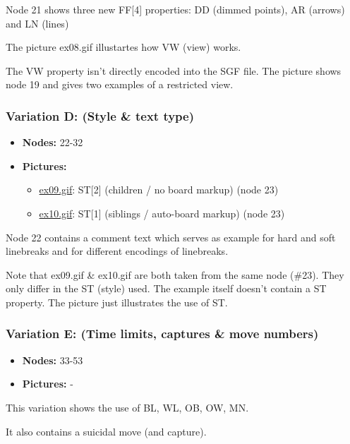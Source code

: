 Node 21 shows three new FF{[}4{]} properties: DD (dimmed points), AR
(arrows) and LN (lines)

The picture ex08.gif illustartes how VW (view) works.

The VW property isn't directly encoded into the SGF file. The picture
shows node 19 and gives two examples of a restricted view.

\subsubsection{Variation D: (Style \& text
type)}\label{variation-d-style-text-type}

\begin{itemize}
\item
  \textbf{Nodes:} 22-32
\item
  \textbf{Pictures:}

  \begin{itemize}
  \item
    \href{https://red-bean.com/sgf/examples/ex09.gif}{ex09.gif}:
    ST{[}2{]} (children / no board markup) (node 23)
  \item
    \href{https://red-bean.com/sgf/examples/ex10.gif}{ex10.gif}:
    ST{[}1{]} (siblings / auto-board markup) (node 23)
  \end{itemize}
\end{itemize}

Node 22 contains a comment text which serves as example for hard and
soft linebreaks and for different encodings of linebreaks.

Note that ex09.gif \& ex10.gif are both taken from the same node (\#23).
They only differ in the ST (style) used. The example itself doesn't
contain a ST property. The picture just illustrates the use of ST.

\subsubsection{Variation E: (Time limits, captures \& move
numbers)}\label{variation-e-time-limits-captures-move-numbers}

\begin{itemize}
\item
  \textbf{Nodes:} 33-53
\item
  \textbf{Pictures:} -
\end{itemize}

This variation shows the use of BL, WL, OB, OW, MN.

It also contains a suicidal move (and capture).

